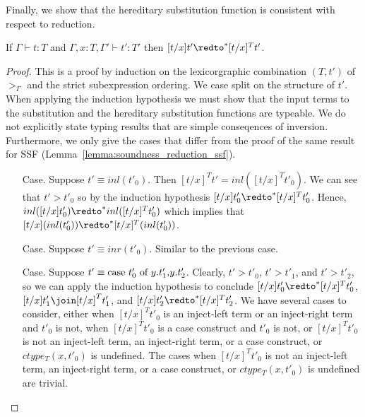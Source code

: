 \noindent
Finally, we show that the hereditary substitution function is
consistent with respect to reduction.
\begin{lemma}
  \label{lemma:soundness_reduction_ssfp}
  If $\Gamma \vdash t : T$ and $\Gamma, x:T, \Gamma' \vdash t':T'$ then
  $[t/x]t' \redto^* [t/x]^T t'$.
\end{lemma}
\begin{proof}
  This is a proof by induction on the lexicorgraphic combination
  $(T, t')$ of $>_\Gamma$ and the strict subexpression ordering.
  We case split on the structure of $t'$.  When applying the induction
  hypothesis we must show that the input terms to the substitution and
  the hereditary substitution functions are typeable.  We do not
  explicitly state typing results that are simple conseqences of
  inversion.  Furthermore, we only give the cases that differ from the
  proof of the same result for SSF
  (Lemma~\ref{lemma:soundness_reduction_ssf}).

  \begin{itemize}
  \item[Case.] Suppose $t' \equiv inl(t'_0)$.  Then $[t/x]^T t' = inl([t/x]^T t'_0)$.  We can
    see that $t' > t'_0$ so by the induction hypothesis $[t/x]t'_0 \redto^* [t/x]^T t'_0$.  Hence,
    $inl([t/x]t'_0) \redto^* inl([t/x]^T t'_0)$ which implies that 
    $[t/x](inl(t'_0)) \redto^* [t/x]^T (inl(t'_0))$.
    
  \item[Case.] Suppose $t' \equiv inr(t'_0)$.  Similar to the previous case.
    
  \item[Case.] Suppose $t' \equiv \mbox{case}\ t'_0\ \text{of}\ y\text{.}t'_1\text{,}y\text{.}t'_2$.  Clearly, $t' > t'_0$,
    $t' > t'_1$, and $t' > t'_2$, so we can apply the induction hypothesis to conclude 
    $[t/x]t'_0 \redto^* [t/x]^T t'_0$, $[t/x]t'_1 \join [t/x]^T t'_1$, and 
    $[t/x]t'_2 \redto^* [t/x]^T t'_2$.  We have several cases to consider, either when $[t/x]^T t'_0$ is an
    inject-left term or an inject-right term and $t'_0$ is not, when $[t/x]^T t'_0$ is a case construct
    and $t'_0$ is not, or $[t/x]^T t'_0$ is not an inject-left term, an inject-right term, or a case construct, or
    $ctype_T(x,t'_0)$ is undefined.  The cases when $[t/x]^T t'_0$ is not an inject-left term, an inject-right term, 
    or a case construct, or $ctype_T(x,t'_0)$ is undefined are trivial.
    

\end{itemize}
\end{proof}
